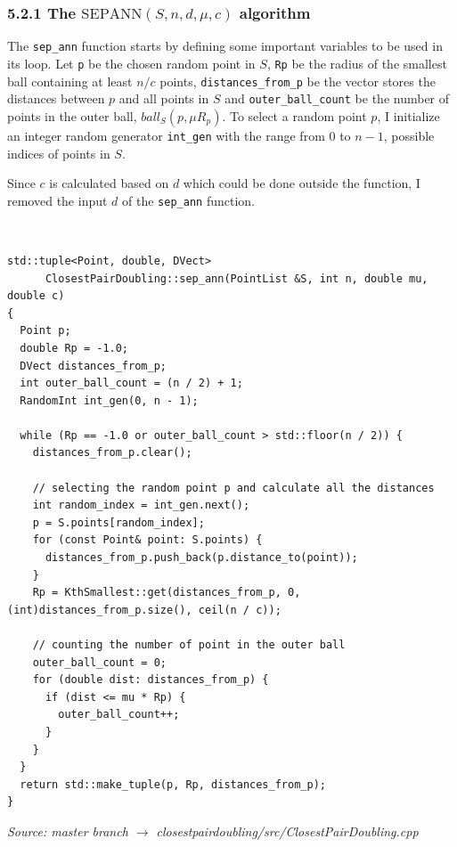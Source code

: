 \documentclass[12pt,english,]{article}
\newcommand{\code}[1]{\colorbox{lbcolor}{\texttt{#1}}}
\newcommand{\pnt}[1]{{\scriptstyle#1}}
\begin{document}
\hypertarget{section5.2.1}{%
\subsubsection{\texorpdfstring{5.2.1 The
\(\mathrm{S\pnt{EP}A\pnt{NN}}(S,n,d,\mu,c)\)
algorithm}{5.2.1 The \textbackslash{}mathrm\{S\textbackslash{}pnt\{EP\}A\textbackslash{}pnt\{NN\}\}(S,n,d,\textbackslash{}mu,c) algorithm}}\label{section5.2.1}}

The \code{sep\_ann} function starts by defining some important variables
to be used in its loop. Let \code{p} be the chosen random point in
\(S\), \code{Rp} be the radius of the smallest ball containing at least
\(n/c\) points, \code{distances\_from\_p} be the vector stores the
distances between \(p\) and all points in \(S\) and
\code{outer\_ball\_count} be the number of points in the outer ball,
\(ball_S(p,\mu R_p)\). To select a random point \(p\), I initialize an
integer random generator \code{int\_gen} with the range from 0 to
\(n - 1\), possible indices of points in \(S\).

Since \(c\) is calculated based on \(d\) which could be done outside the
function, I removed the input \(d\) of the \code{sep\_ann} function.

~

\begin{lstlisting}
std::tuple<Point, double, DVect>
      ClosestPairDoubling::sep_ann(PointList &S, int n, double mu, double c)
{
  Point p;
  double Rp = -1.0;
  DVect distances_from_p;
  int outer_ball_count = (n / 2) + 1;
  RandomInt int_gen(0, n - 1);

  while (Rp == -1.0 or outer_ball_count > std::floor(n / 2)) {
    distances_from_p.clear();

    // selecting the random point p and calculate all the distances
    int random_index = int_gen.next();
    p = S.points[random_index];
    for (const Point& point: S.points) {
      distances_from_p.push_back(p.distance_to(point));
    }
    Rp = KthSmallest::get(distances_from_p, 0, (int)distances_from_p.size(), ceil(n / c));

    // counting the number of point in the outer ball
    outer_ball_count = 0;
    for (double dist: distances_from_p) {
      if (dist <= mu * Rp) {
        outer_ball_count++;
      }
    }
  }
  return std::make_tuple(p, Rp, distances_from_p);
}
\end{lstlisting}
\vspace{-2truemm}
\begin{minipage}{1\textwidth}
  \begin{flushright}
  {\footnotesize \emph{Source: master branch $\rightarrow$ closestpairdoubling/src/ClosestPairDoubling.cpp}\par}
  \end{flushright}
\end{minipage}
\vspace{0.5truemm}
\end{document}
